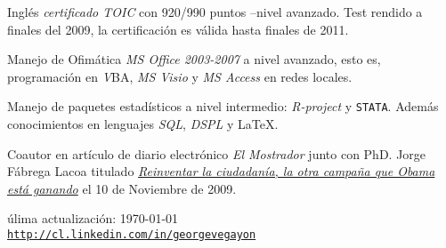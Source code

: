 \documentclass[letterpaper, 12pt]{article}
\def\footerlink{http://cl.linkedin.com/in/georgevegayon}
\renewenvironment{itemize}{
  \begin{list}{}{
    \setlength{\leftmargin}{0.45cm}
  }
}{
  \end{list}
}
\begin{document}
\begin{itemize}
\item Inglés \emph{certificado TOIC} con 920/990 puntos --nivel avanzado. Test rendido a finales del 2009, la certificación es válida hasta finales de 2011.
\item Manejo de Ofimática \emph{MS Office 2003-2007} a nivel avanzado, esto es, programación en \emph VBA, \emph{MS Visio} y \emph{MS Access} en redes locales.
\item Manejo de paquetes estadísticos a nivel intermedio: \emph{R-project} y \texttt{STATA}. Además conocimientos en lenguajes \emph{SQL}, \emph{DSPL} y \LaTeX.
\item Coautor en artículo de diario electrónico \emph{El Mostrador} junto con PhD. Jorge Fábrega Lacoa titulado \href{http://www.uai.cl/200911165701/columna-de-opinion/columnas-opinion/reinventar-la-ciudadania-la-otra-campana-que-obama-esta-ganando}{\emph {Reinventar la ciudadanía, la otra campaña que Obama está ganando}} el 10 de Noviembre de 2009.
\end{itemize}

\bigskip

\begin{center}
  \begin{footnotesize}
    úlima actualización: \today \\
    \href{\footerlink}{\texttt{\footerlink}}
  \end{footnotesize}
\end{center}
\end{document}
